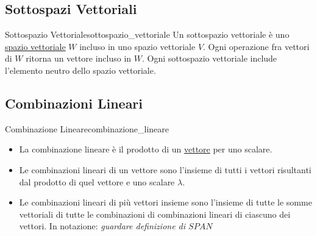 \documentclass{article}
\begin{document}
\subsection{Sottospazi Vettoriali}

\begin{definition}{Sottospazio Vettoriale}{sottospazio_vettoriale}
    Un sottospazio vettoriale è uno \hyperlink{def:spazio_vettoriale}{spazio vettoriale} $W$ incluso in uno spazio vettoriale $V$. Ogni operazione fra vettori di $W$ ritorna un vettore incluso in $W$. Ogni sottospazio vettoriale include l'elemento neutro dello spazio vettoriale.
\end{definition}

\subsection{Combinazioni Lineari}

\begin{definition}{Combinazione Lineare}{combinazione_lineare}
    \begin{itemize}
        \item La combinazione lineare è il prodotto di un \hyperlink{def:vettore}{vettore} per uno scalare.
        \item Le combinazioni lineari di un vettore sono l'insieme di tutti i vettori risultanti dal prodotto di quel vettore e uno scalare $\lambda$.
        \item Le combinazioni lineari di più vettori insieme sono l'insieme di tutte le somme vettoriali di tutte le combinazioni di combinazioni lineari di ciascuno dei vettori. In notazione: \it{guardare definizione di \hyperlink{def:span}{$SPAN$}}
    \end{itemize}
\end{definition}
\end{document}
